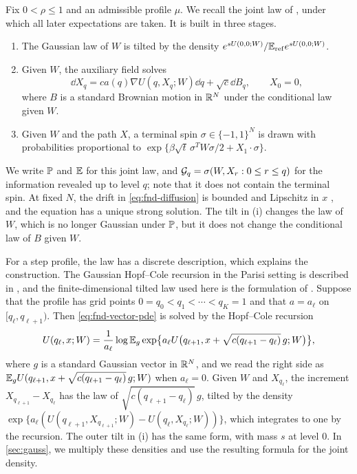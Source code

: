Fix $0<\rho\le1$ and an admissible profile $\mu$. We recall the joint
law of \cite[Section~2]{AL}, under which all later expectations are
taken. It is built in three stages.
\begin{enumerate}[label=(\roman*)]
\item The Gaussian law of $W$ is tilted by the density
$e^{sU(0,0;W)}/\mathbb E_{\rm ref}e^{sU(0,0;W)}$.
\item Given $W$, the auxiliary field solves
\begin{equation}\label{eq:fnd-diffusion}
 \dd X_q=ca(q)\nabla U(q,X_q;W)\dd q+\sqrt c\dd B_q,
 \qquad X_0=0,
\end{equation}
where $B$ is a standard Brownian motion in $\mathbb R^N$ under the conditional
law given $W$.
\item Given $W$ and the path $X$, a terminal spin
$\sigma\in\{-1,1\}^N$ is drawn with probabilities proportional to
$\exp\{\beta\sqrt t\,\sigma^TW\sigma/2+X_1\cdot\sigma\}$.
\end{enumerate}
We write $\mathbb P$ and $\mathbb E$ for this joint law, and
$\mathcal G_q=\sigma(W,X_r:0\le r\le q)$ for the information revealed up to
level $q$; note that it does not contain the terminal spin. At fixed $N$, the
drift in \eqref{eq:fnd-diffusion} is bounded and Lipschitz in $x$
\cite[Section~2.6.1]{AL}, and the equation has a unique strong solution.
The tilt in (i) changes the law of $W$, which is no longer Gaussian under
$\mathbb P$, but it does not change the
conditional law of $B$ given $W$.

For a step profile, the law has a discrete description, which explains
the construction. The Gaussian Hopf--Cole recursion in the Parisi setting
is described in \cite[Section~3, (10)--(13)]{Guerra2003}, and the
finite-dimensional tilted law used here is the formulation of
\cite[Section~2.1]{AL}.
Suppose that the profile has grid points
$0=q_0<q_1<\cdots<q_K=1$ and that $a=a_\ell$ on $[q_\ell,q_{\ell+1})$. Then
\eqref{eq:fnd-vector-pde} is solved by the Hopf--Cole recursion
\[
 U(q_\ell,x;W)=\frac1{a_\ell}\log\mathbb E_g
 \exp\bigl\{a_\ell U\bigl(q_{\ell+1},x+\sqrt{c(q_{\ell+1}-q_\ell)}\,g;W\bigr)\bigr\},
\]
where $g$ is a standard Gaussian vector in $\mathbb R^N$, and we read the right
side as $\mathbb E_gU(q_{\ell+1},x+\sqrt{c(q_{\ell+1}-q_\ell)}\,g;W)$ when
$a_\ell=0$. Given $W$ and $X_{q_\ell}$, the increment
$X_{q_{\ell+1}}-X_{q_\ell}$ has the law of
$\sqrt{c(q_{\ell+1}-q_\ell)}\,g$, tilted by the density
$\exp\{a_\ell(U(q_{\ell+1},X_{q_{\ell+1}};W)-U(q_\ell,X_{q_\ell};W))\}$,
which integrates to one by the recursion. The outer tilt in (i) has the
same form, with mass $s$ at level $0$. In \cref{sec:gauss}, we multiply
these densities and use the resulting formula for the joint density.

